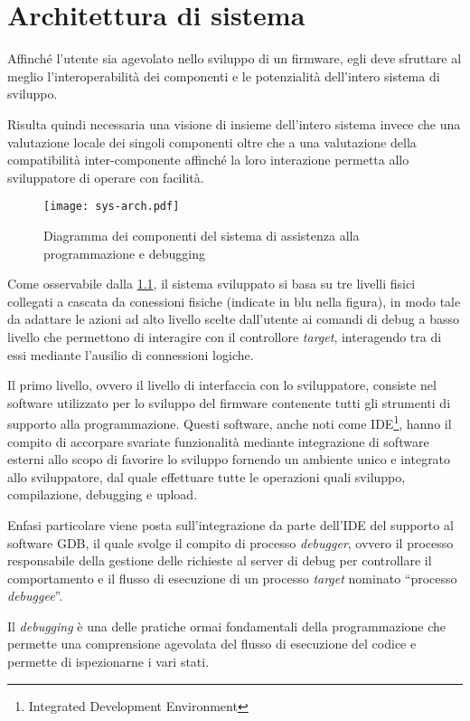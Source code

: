 \chapter{Architettura di sistema}

Affinché l'utente sia agevolato nello sviluppo di un firmware, egli deve sfruttare al meglio l'interoperabilità dei componenti e le potenzialità dell'intero sistema di sviluppo.

Risulta quindi necessaria una visione di insieme dell'intero sistema invece che una valutazione locale dei singoli componenti oltre che a una valutazione della compatibilità inter-componente affinché la loro interazione permetta allo sviluppatore di operare con facilità.

\begin{figure}[t]
    \centering
    \texttt{[image: sys-arch.pdf]}
    \caption[]{Diagramma dei componenti del sistema di assistenza alla programmazione e debugging}\label{fig:sys-arch}
\end{figure}

Come osservabile dalla \cref{fig:sys-arch}, il sistema sviluppato si basa su tre livelli fisici collegati a cascata da conessioni fisiche (indicate in blu nella figura), in modo tale da adattare le azioni ad alto livello scelte dall'utente ai comandi di debug a basso livello che permettono di interagire con il controllore \textit{target}, interagendo tra di essi mediante l'ausilio di connessioni logiche. 

Il primo livello, ovvero il livello di interfaccia con lo sviluppatore, consiste nel software utilizzato per lo sviluppo del firmware contenente tutti gli strumenti di supporto alla programmazione. Questi software, anche noti come IDE\footnote{Integrated Development Environment}, hanno il compito di accorpare svariate funzionalità mediante integrazione di software esterni allo scopo di favorire lo sviluppo fornendo un ambiente unico e integrato allo sviluppatore, dal quale effettuare tutte le operazioni quali sviluppo, compilazione, debugging e upload.

Enfasi particolare viene posta sull'integrazione da parte dell'IDE del supporto al software GDB, il quale svolge il compito di processo \textit{debugger}, ovvero il processo responsabile della gestione delle richieste al server di debug per controllare il comportamento e il flusso di esecuzione di un processo \textit{target} nominato ``processo \textit{debuggee}''.

Il \textit{debugging} è una delle pratiche ormai fondamentali della programmazione che permette una comprensione agevolata del flusso di esecuzione del codice e permette di ispezionarne i vari stati.

